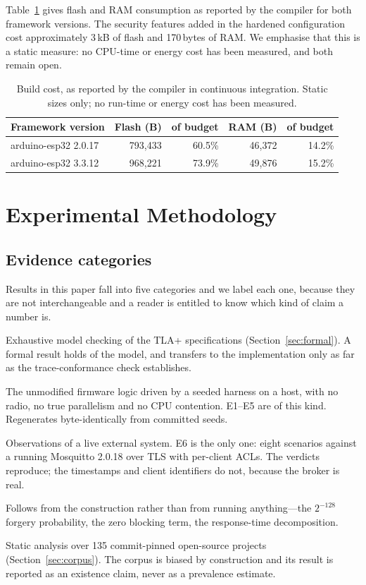 Table~\ref{tab:build} gives flash and RAM consumption as reported by the compiler for both
framework versions. The security features added in the hardened configuration cost
approximately 3\,kB of flash and 170\,bytes of RAM. We emphasise that this is a static measure:
no CPU-time or energy cost has been measured, and both remain open.

\begin{table}[htbp]
\centering\small
\caption{Build cost, as reported by the compiler in continuous integration. Static sizes only;
no run-time or energy cost has been measured.}
\label{tab:build}
\begin{tabular}{@{}lrrrr@{}}
\toprule
Framework version & Flash (B) & of budget & RAM (B) & of budget \\
\midrule
arduino-esp32 2.0.17 & 793{,}433 & 60.5\% & 46{,}372 & 14.2\% \\
arduino-esp32 3.3.12 & 968{,}221 & 73.9\% & 49{,}876 & 15.2\% \\
\bottomrule
\end{tabular}
\end{table}

\section{Experimental Methodology}\label{sec:method}

\subsection{Evidence categories}

Results in this paper fall into five categories and we label each one, because they are not
interchangeable and a reader is entitled to know which kind of claim a number is.

\begin{description}[leftmargin=1.6em,itemsep=0.2em]
\item[Formal.] Exhaustive model checking of the TLA+ specifications (Section~\ref{sec:formal}).
A formal result holds of the model, and transfers to the implementation only as far as the
trace-conformance check establishes.
\item[Simulation.] The unmodified firmware logic driven by a seeded harness on a host, with no
radio, no true parallelism and no CPU contention. E1--E5 are of this kind. Regenerates
byte-identically from committed seeds.
\item[Testbed measurement.] Observations of a live external system. E6 is the only one: eight
scenarios against a running Mosquitto 2.0.18 over TLS with per-client ACLs. The verdicts
reproduce; the timestamps and client identifiers do not, because the broker is real.
\item[Analytical.] Follows from the construction rather than from running anything---the
$2^{-128}$ forgery probability, the zero blocking term, the response-time decomposition.
\item[Corpus study.] Static analysis over 135 commit-pinned open-source projects
(Section~\ref{sec:corpus}). The corpus is biased by construction and its result is reported as
an existence claim, never as a prevalence estimate.
\end{description}

